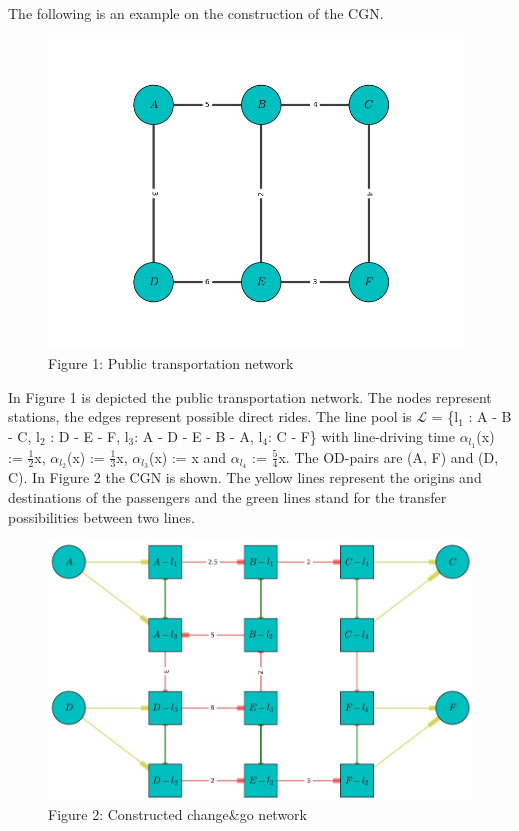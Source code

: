 \documentclass[
  twoside,
  11pt, a4paper,
  footinclude=true,
  headinclude=true,
  cleardoublepage=empty
]{scrbook}
\theoremstyle{definition}
\begin{document}
The following is an example on the construction of the CGN.\newline
\begin{figure}[htbp]
\centering
\includegraphics[width=11cm]{esempio1.jpeg}%
\caption*{Figure 1: Public transportation network}
\end{figure}
In Figure 1 is depicted the public transportation network. The nodes represent stations, the edges represent possible direct rides.\newline
The line pool is $\mathcal{L}$ = \{l$_1$ : A - B - C, l$_2$ : D - E - F, l$_3$: A - D - E - B - A, l$_4$: C - F\} with line-driving time $\alpha_{l_1}$(x) := $\frac{1}{2}$x, $\alpha_{l_2}$(x) := $\frac{1}{3}$x, $\alpha_{l_3}$(x) := x and $\alpha_{l_4}$ := $\frac{5}{4}$x. The OD-pairs are (A, F) and (D, C). \newline
In Figure 2 the CGN is shown. The yellow lines represent the origins and destinations of the passengers and the green lines stand for the transfer possibilities between two lines.
\begin{figure}[htbp]
\centering
\includegraphics[width=12cm]{figura1.jpg}%
\caption*{Figure 2: Constructed change\&go network}
\end{figure}
\end{document}
